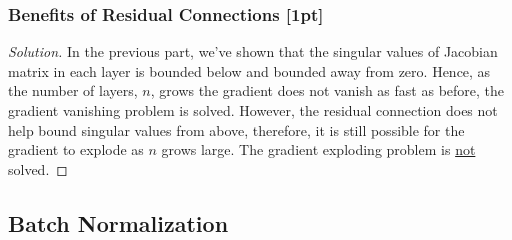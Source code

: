 \documentclass{article}
\begin{document}
	\subsubsection{Benefits of Residual Connections [1pt]}
	\begin{proof}[Solution]
		In the previous part, we've shown that the singular values of Jacobian matrix in each layer is bounded below and bounded away from zero. Hence, as the number of layers, $n$, grows the gradient does not vanish as fast as before, the gradient vanishing problem is solved. However, the residual connection does not help bound singular values from above, therefore, it is still possible for the gradient to explode as $n$ grows large. The gradient exploding problem is \ul{not} solved.
	\end{proof}
	
	\subsection{Batch Normalization}
\end{document}
